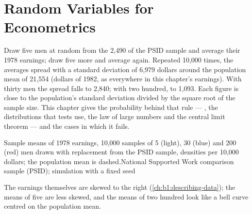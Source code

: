 \chapter{Random Variables for Econometrics}\label{ch:b1:random-variables-for-econometrics}

Draw five men at random from the 2,490 of the PSID sample and average their
1978 earnings; draw five more and average again. Repeated 10,000 times, the
averages spread with a standard deviation of 6,979 dollars around the
population mean of 21,554 (dollars of 1982, as everywhere in this chapter's
earnings). %
With thirty men the spread falls to 2,840; with two
hundred, to 1,093. %
Each figure is close to the population's standard deviation divided by
the square root of the sample size. This chapter gives the probability
behind that rule --- , the distributions that
tests use, the law of large numbers and the central limit theorem --- and
the cases in which it fails.

\begin{openingchart}{Sample means of 1978 earnings, 10,000 samples of 5 (light),
30 (blue) and 200 (red) men drawn with replacement from the PSID sample,
densities per 10,000 dollars; the population mean is dashed.}{National
Supported Work comparison sample (PSID); simulation with a fixed seed}
\end{openingchart}

The earnings themselves are skewed to the right (\cref{ch:b1:describing-data}); the
means of five are less skewed, and the means of two hundred look like a bell
curve centred on the population mean.

